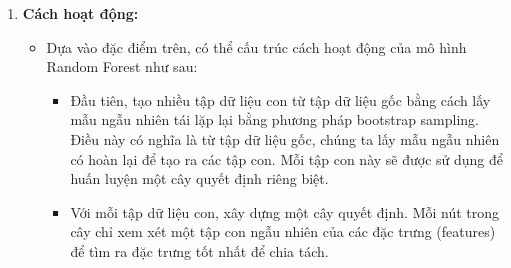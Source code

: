 \documentclass[13pt]{article}
\begin{document}
\begin{enumerate}
\begin{enumerate}
        \item \textbf{Cách hoạt động: }
        \begin{itemize}
            \item Dựa vào đặc điểm trên, có thể cấu trúc cách hoạt động của mô hình Random Forest như sau:
            \begin{itemize}
                \item Đầu tiên, tạo nhiều tập dữ liệu con từ tập dữ liệu gốc bằng cách lấy mẫu ngẫu nhiên tái lặp lại bằng phương pháp bootstrap sampling. Điều này có nghĩa là từ tập dữ liệu gốc, chúng ta lấy mẫu ngẫu nhiên có hoàn lại để tạo ra các tập con. Mỗi tập con này sẽ được sử dụng để huấn luyện một cây quyết định riêng biệt.
                \item Với mỗi tập dữ liệu con, xây dựng một cây quyết định. Mỗi nút trong cây chỉ xem xét một tập con ngẫu nhiên của các đặc trưng (features) để tìm ra đặc trưng tốt nhất để chia tách.
            \end{itemize}
        \end{itemize}


\end{enumerate}
\end{enumerate}
\end{document}
